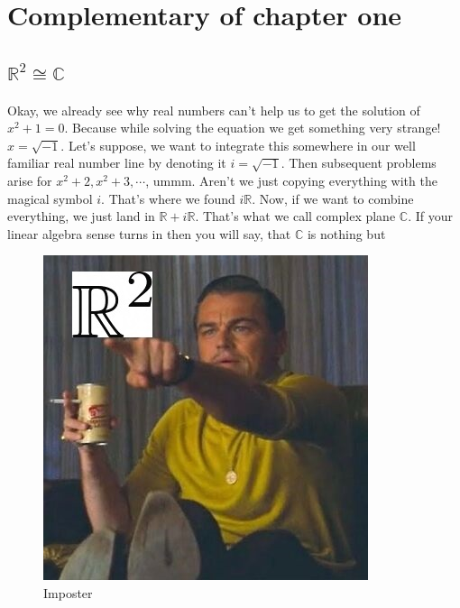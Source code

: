 \section{Complementary of chapter one}
\subsection{$\mathbb{R}^2\cong\mathbb{C}$}
Okay, we already see why real numbers can't help us to get the solution of $x^2+1=0$. Because while solving the equation we get something very strange! $x=\sqrt{-1}$. Let's suppose, we want to integrate this somewhere in our well familiar real number line by denoting it $i=\sqrt{-1}$. Then subsequent problems arise for $x^2+2,x^2+3,\cdots$, ummm. Aren't we just copying everything with the magical symbol $i$. That's where we found $i\mathbb{R}$. Now, if we want to combine everything, we just land in $\mathbb{R}+i\mathbb{R}$. That's what we call complex plane $\mathbb{C}$. If your linear algebra sense turns in then you will say, that $\mathbb{C}$ is nothing but 

\begin{figure}[ht!]
    \centering
    \includegraphics[width=0.5\linewidth]{MEMES/com_me.jpg}
    \caption{Imposter}
    \label{fig:com_me}
\end{figure}

